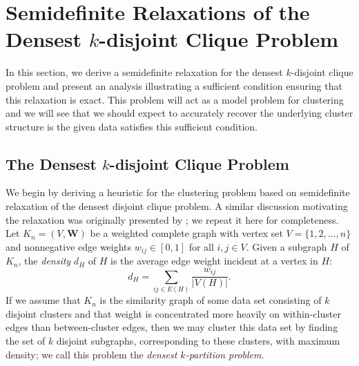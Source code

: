 \documentclass[twoside,11pt]{article}
\newcommand{\bs}{\boldsymbol}
\newcommand{\W}{\bs {W}}
\newcommand{\0}{\bs{0}}
\begin{document}
\section{Semidefinite Relaxations of the Densest \(k\)-disjoint Clique Problem}

In this section, we derive a semidefinite relaxation for the densest \(k\)-disjoint clique problem
and present an analysis illustrating a sufficient condition ensuring that this relaxation 
is exact. This problem will act as a model problem for clustering and we will see that
we should expect
to accurately recover the underlying cluster structure is the given data
satisfies this sufficient condition.

\subsection{The Densest \(k\)-disjoint Clique Problem}
\label{sec: kdc}
We begin by deriving a heuristic for the clustering problem based on semidefinite relaxation
of the densest disjoint clique problem.
A similar discussion motivating the relaxation was originally presented by \cite{ames2014guaranteed}; we repeat it here for completeness.
Let $K_n=(V, \W)$ be a weighted complete graph with vertex set 
$V=\{1,2,\dots,n\}$ and nonnegative edge weights $w_{ij} \in [0,1]$ for all $i,j \in V$. 
Given a subgraph \(H\) of \(K_n\), the \emph{density} \(d_H\) of \(H\)
is the average edge weight incident at a vertex in \(H\):
\[
d_H = \sum_{ij \in E(H)} \frac{w_{ij}}{|V(H)|}.
\]
If we assume that \(K_n\) is the similarity graph of some data set consisting
of \(k\) disjoint clusters and that weight
is concentrated more heavily on within-cluster edges than between-cluster
edges, then we may cluster this data set by finding the set of \(k\) disjoint
subgraphs, corresponding to these clusters, with maximum density;
we call this problem the \emph{densest \(k\)-partition problem}.
\end{document}
